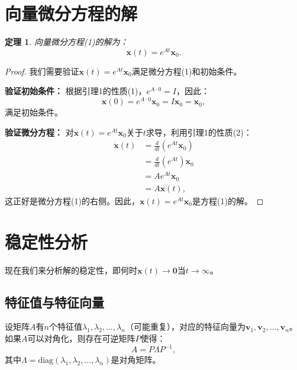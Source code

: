 \documentclass[12pt,a4paper]{article}
\newtheorem{theorem}{定理}
\newtheorem{proof}{证明}
\begin{document}
\section{向量微分方程的解}

\begin{theorem}
向量微分方程(1)的解为：
\begin{equation}
\mathbf{x}(t) = e^{At}\mathbf{x}_0.
\end{equation}
\end{theorem}

\begin{proof}
我们需要验证$\mathbf{x}(t) = e^{At}\mathbf{x}_0$满足微分方程(1)和初始条件。

\textbf{验证初始条件：}
根据引理1的性质(1)，$e^{A \cdot 0} = I$，因此：
\begin{equation}
\mathbf{x}(0) = e^{A \cdot 0}\mathbf{x}_0 = I\mathbf{x}_0 = \mathbf{x}_0,
\end{equation}
满足初始条件。

\textbf{验证微分方程：}
对$\mathbf{x}(t) = e^{At}\mathbf{x}_0$关于$t$求导，利用引理1的性质(2)：
\begin{align}
\dot{\mathbf{x}}(t) &= \frac{d}{dt}\left(e^{At}\mathbf{x}_0\right) \\
&= \frac{d}{dt}\left(e^{At}\right)\mathbf{x}_0 \\
&= Ae^{At}\mathbf{x}_0 \\
&= A\mathbf{x}(t),
\end{align}
这正好是微分方程(1)的右侧。因此，$\mathbf{x}(t) = e^{At}\mathbf{x}_0$是方程(1)的解。
\end{proof}

\section{稳定性分析}

现在我们来分析解的稳定性，即何时$\mathbf{x}(t) \to \mathbf{0}$当$t \to \infty$。

\subsection{特征值与特征向量}

设矩阵$A$有$n$个特征值$\lambda_1, \lambda_2, \ldots, \lambda_n$（可能重复），对应的特征向量为$\mathbf{v}_1, \mathbf{v}_2, \ldots, \mathbf{v}_n$。如果$A$可以对角化，则存在可逆矩阵$P$使得：
\begin{equation}
A = P\Lambda P^{-1},
\end{equation}
其中$\Lambda = \text{diag}(\lambda_1, \lambda_2, \ldots, \lambda_n)$是对角矩阵。
\end{document}
